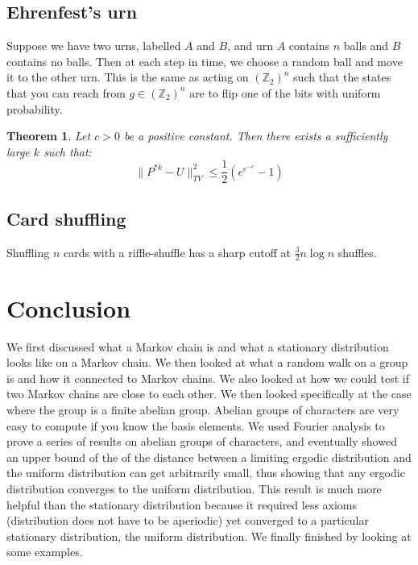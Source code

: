 \documentclass[]{article}
\newtheorem{theorem}{Theorem}
\theoremstyle{definition}
\numberwithin{theorem}{section}
\numberwithin{equation}{section}
\begin{document}
\subsection{Ehrenfest's urn}
Suppose we have two urns, labelled $A$ and $B$, and urn $A$ contains $n$ balls and $B$ contains no balls. Then at each step in time, we choose a random ball and move it to the other urn. This is the same as acting on $(\mathbb{Z}_2)^n$ such that the states that you can reach from $g \in (\mathbb{Z}_2)^n$ are to flip one of the bits with uniform probability. 

\begin{theorem}
	Let $c > 0$ be a positive constant. Then there exists a sufficiently large $k$ such that:
	\begin{equation}
		\|P^{\ast k} - U\|^2_{TV} \leq \frac{1}{2} (e^{e^{-c}} - 1)
	\end{equation}
\end{theorem}

\subsection{Card shuffling}
Shuffling $n$ cards with a riffle-shuffle has a sharp cutoff at $\frac{3}{2} n \log n$ shuffles. 
\section{Conclusion}
We first discussed what a Markov chain is and what a stationary distribution looks like on a Markov chain. We then looked at what a random walk on a group is and how it connected to Markov chains. We also looked at how we could test if two Markov chains are close to each other. We then looked specifically at the case where the group is a finite abelian group. Abelian groups of characters are very easy to compute if you know the basis elements. We used Fourier analysis to prove a series of results on abelian groups of characters, and eventually showed an upper bound of the of the distance between a limiting ergodic distribution and the uniform distribution can get arbitrarily small, thus showing that any ergodic distribution converges to the uniform distribution. This result is much more helpful than the stationary distribution because it required less axioms (distribution does not have to be aperiodic) yet converged to a particular stationary distribution, the uniform distribution. We finally finished by looking at some examples. 
\end{document}
